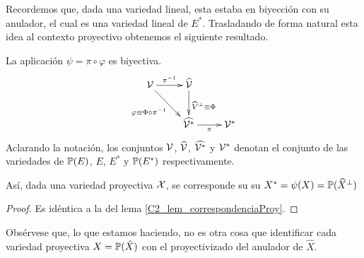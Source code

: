 Recordemos que, dada una variedad lineal, esta estaba en biyección con su anulador, el cual es una variedad lineal de $E^*$. Trasladando de forma natural esta idea al contexto proyectivo obtenemos el siguiente resultado.
\begin{lem}
	\label{C2_lem_correspondencia_proy_anulador}
	La aplicación $\psi=\pi\circ\varphi$ es biyectiva.
	\begin{equation*}
		\xymatrix{
			\mc{V} \ar[r]^{\pi^{-1}} \ar[dr]_{\varphi\equiv\Phi\circ\pi^{-1}} & \widehat{\mc{V}} \ar[d]^{\widehat{V}^\perp\equiv\Phi} & \\
			& \widehat{\mc{V}^*} \ar[r]_{\pi} & \mc{V}^* 
		}
	\end{equation*}
	Aclarando la notación, los conjuntos $\mathcal{V}$, $\widehat{\mathcal{V}}$, $\widehat{\mathcal{V}^*}$ y $\mathcal{V}^*$ denotan el conjunto de las variedades de $\mathbb{P}(E)$, $E$, $E^*$ y $\mathbb{P}(E^*)$ respectivamente.
	
	Así, dada una variedad proyectiva $\mathcal{X}$, se corresponde su su  $X^*=\psi(X)=\mathbb{P}(\widehat{X}^\perp)$
\end{lem}
\begin{proof}
	Es idéntica a la del lema \ref{C2_lem_correspondenciaProy}.
\end{proof}

Obsérvese que, lo que estamos haciendo, no es otra cosa que identificar cada variedad proyectiva $X=\mathbb{P}(\hat{X})$ con el proyectivizado del anulador de $\widehat{X}$.

